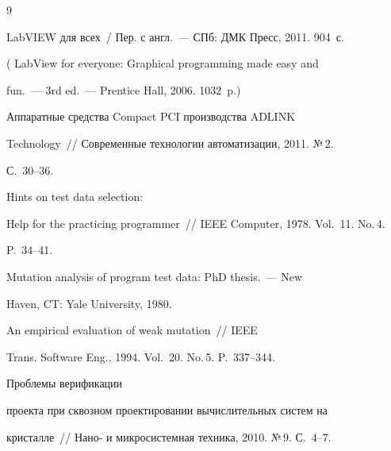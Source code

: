 {\small\frenchspacing


{%




\begin{thebibliography}{9}





\vspace*{-2pt}







 LabVIEW для всех~/ Пер. с англ.~--- СПб: ДМК Пресс, 2011. 904~с.


( LabView for everyone: Graphical programming made easy and


fun.~--- 3rd ed.~--- Prentice Hall, 2006. 1032~p.)







 Аппаратные средства Compact PCI производства ADLINK


Technology~/\!\!/ Современные технологии автоматизации, 2011. №\,2.


С.~30--36.










 Hints on test data selection:


Help for the practicing programmer~/\!\!/ IEEE Computer, 1978. Vol.~11. No.\,4.


P.~34--41.







 Mutation analysis of program test data: PhD thesis.~--- New


Haven, CT: Yale University, 1980.







 An empirical evaluation of weak mutation~/\!\!/ IEEE


Trans. Software Eng., 1994. Vol.~20. No.\,5. P.~337--344.




 Проблемы верификации


проекта при сквозном проектировании вычислительных систем на


кристалле~/\!\!/ Нано- и микросистемная техника, 2010. №\,9. С.~4--7.


\end{thebibliography}


}


}





